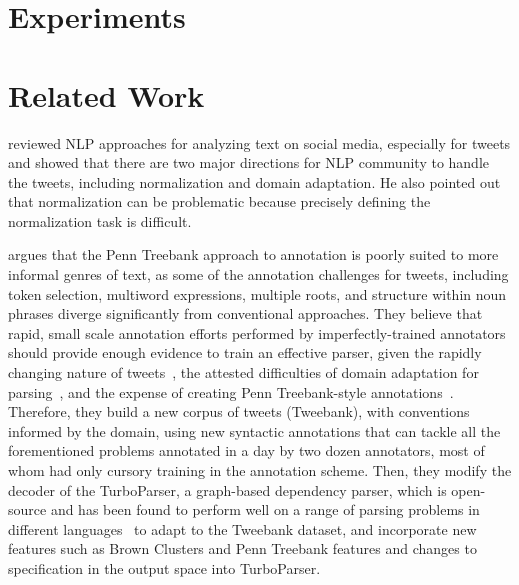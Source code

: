 \documentclass[11pt,letterpaper]{article}
\begin{document}
\section{Experiments}


\section{Related Work}
 reviewed NLP approaches for analyzing text on social media, especially for tweets and showed that there are two major directions for NLP community to handle the tweets, including normalization and domain adaptation. He also pointed out that normalization can be problematic because precisely defining the normalization task is difficult. 

 argues that the Penn Treebank approach to annotation is poorly suited to more informal genres of text, as some of the annotation challenges for tweets,
including token selection, multiword expressions, multiple roots, and structure within noun phrases diverge significantly from conventional approaches. 
They believe that rapid, small scale annotation efforts performed by imperfectly-trained annotators should provide enough evidence to train an effective parser, given the rapidly changing nature of tweets~\cite{eisenstein:2013:NAACL-HLT}, the attested difficulties of domain adaptation for parsing~\cite{dred07}, and the expense of creating Penn Treebank-style annotations~\cite{penn93}. 
Therefore, they build a new corpus of tweets (Tweebank), with conventions informed by the domain, using new syntactic annotations that can tackle all the forementioned problems annotated in a day by two dozen annotators, most of whom had only cursory training in the annotation scheme. Then, they modify the decoder of the TurboParser, a graph-based dependency parser, which is open-source and has been found to perform well on a range of parsing problems in different languages~\cite{turbo13} to adapt to the Tweebank dataset, and incorporate new features such as Brown Clusters and Penn Treebank features and changes to specification
in the output space into TurboParser.
\end{document}
